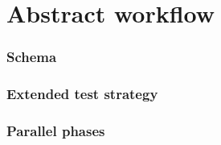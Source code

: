 \section{Abstract workflow}\label{sec:abstract-workflow}

\subsubsection{Schema}

\subsubsection{Extended test strategy}

\subsubsection{Parallel phases}
